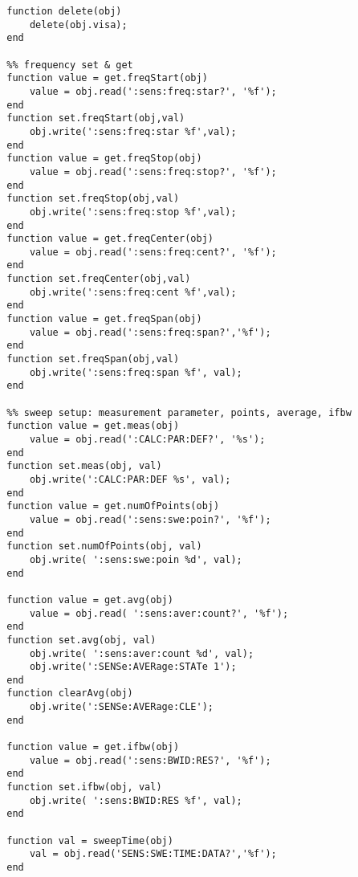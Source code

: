 \begin{lstlisting}
        function delete(obj)
            delete(obj.visa);
        end
        
        %% frequency set & get
        function value = get.freqStart(obj)
            value = obj.read(':sens:freq:star?', '%f');
        end
        function set.freqStart(obj,val)
            obj.write(':sens:freq:star %f',val);
        end
        function value = get.freqStop(obj)
            value = obj.read(':sens:freq:stop?', '%f');
        end
        function set.freqStop(obj,val)
            obj.write(':sens:freq:stop %f',val);
        end
        function value = get.freqCenter(obj)
            value = obj.read(':sens:freq:cent?', '%f');
        end
        function set.freqCenter(obj,val)
            obj.write(':sens:freq:cent %f',val);
        end
        function value = get.freqSpan(obj)
            value = obj.read(':sens:freq:span?','%f');
        end
        function set.freqSpan(obj,val)
            obj.write(':sens:freq:span %f', val);
        end
        
        %% sweep setup: measurement parameter, points, average, ifbw
        function value = get.meas(obj)
            value = obj.read(':CALC:PAR:DEF?', '%s');
        end
        function set.meas(obj, val)
            obj.write(':CALC:PAR:DEF %s', val);
        end
        function value = get.numOfPoints(obj)
            value = obj.read(':sens:swe:poin?', '%f');
        end
        function set.numOfPoints(obj, val)
            obj.write( ':sens:swe:poin %d', val);
        end
        
        function value = get.avg(obj)
            value = obj.read( ':sens:aver:count?', '%f');
        end
        function set.avg(obj, val)
            obj.write( ':sens:aver:count %d', val);
            obj.write(':SENSe:AVERage:STATe 1');
        end        
        function clearAvg(obj)
            obj.write(':SENSe:AVERage:CLE');
        end
        
        function value = get.ifbw(obj)
            value = obj.read(':sens:BWID:RES?', '%f');
        end
        function set.ifbw(obj, val)
            obj.write( ':sens:BWID:RES %f', val);
        end
        
        function val = sweepTime(obj)
            val = obj.read('SENS:SWE:TIME:DATA?','%f');
        end
        

\end{lstlisting}
